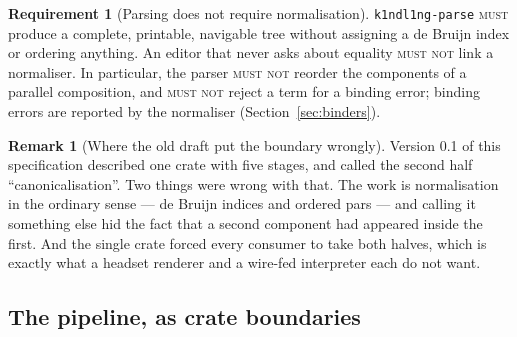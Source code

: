 \documentclass[11pt,a4paper]{article}
\newcommand{\code}[1]{\texttt{#1}}
\newcommand{\MUST}{\textsc{must}}
\newcommand{\MUSTNOT}{\textsc{must not}}
\theoremstyle{definition}
\newtheorem{requirement}[definition]{Requirement}
\newtheorem{remark}[definition]{Remark}
\theoremstyle{plain}
\begin{document}
\begin{requirement}[Parsing does not require normalisation]\label{req:nonorm}
\code{k1ndl1ng-parse} \MUST{} produce a complete, printable, navigable tree
without assigning a de Bruijn index or ordering anything. An editor that never
asks about equality \MUSTNOT{} link a normaliser. In particular, the parser
\MUSTNOT{} reorder the components of a parallel composition, and \MUSTNOT{}
reject a term for a binding error; binding errors are reported by the
normaliser (Section~\ref{sec:binders}).
\end{requirement}

\begin{remark}[Where the old draft put the boundary wrongly]
Version 0.1 of this specification described one crate with five stages, and
called the second half ``canonicalisation''. Two things were wrong with that.
The work is normalisation in the ordinary sense --- de Bruijn indices and
ordered pars --- and calling it something else hid the fact that a second
component had appeared inside the first. And the single crate forced every
consumer to take both halves, which is exactly what a headset renderer and a
wire-fed interpreter each do not want.
\end{remark}

\subsection{The pipeline, as crate boundaries}

\begin{center}
\end{center}
\end{document}
